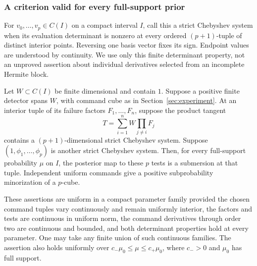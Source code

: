 \subsubsection{A criterion valid for every full-support prior}
For $v_0,\ldots,v_p\in C(I)$ on a compact interval $I$, call this a strict Chebyshev
system when its evaluation determinant is nonzero at every ordered
$(p+1)$-tuple of distinct interior points. Reversing one basis vector
fixes its sign. Endpoint values are understood by continuity. We use
only this finite determinant property, not an unproved assertion about
individual derivatives selected from an incomplete Hermite block.

\begin{theorem}
\label{thm:positive-attainment}
Let $W\subset C(I)$ be finite dimensional and contain $1$. Suppose a
positive finite detector spans $W$, with command cube as in
Section~\ref{sec:experiment}. At an interior tuple of its failure factors
$F_1,\ldots,F_n$, suppose the product tangent
\[
 T=\sum_{i=1}^n W\prod_{j\ne i}F_j
\]
contains a $(p+1)$-dimensional strict Chebyshev system. Suppose
$(1,\phi_1,\ldots,\phi_p)$ is another strict Chebyshev system. Then,
for every full-support probability $\mu$ on $I$, the posterior map to
these $p$ tests is a submersion at that tuple. Independent uniform
commands give a positive subprobability minorization of a $p$-cube.

These assertions are uniform in a compact parameter family provided the
chosen command tuples vary continuously and remain uniformly interior,
the factors and tests are continuous in
uniform norm, the command derivatives through order two are continuous
and bounded, and both determinant properties hold at every parameter.
One may take any finite union of such continuous families. The assertion
also holds uniformly over $c_-\mu_0\le\mu\le c_+\mu_0$, where $c_->0$
and $\mu_0$ has full support.
\end{theorem}

